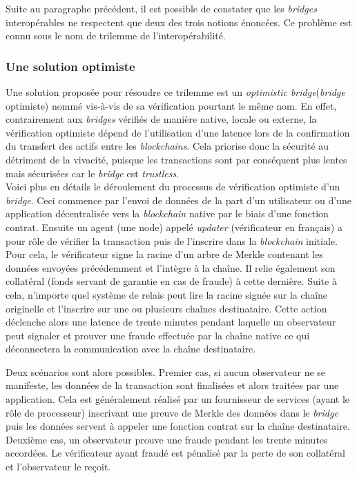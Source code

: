  Suite au paragraphe précédent, il est possible de constater que les \textit{bridges} interopérables ne respectent que deux des trois notions énoncées. Ce problème est connu sous le nom de trilemme de l’interopérabilité. 

\subsubsection{Une solution optimiste}

Une solution proposée pour résoudre ce trilemme est un \textit{optimistic bridge}(\textit{bridge} optimiste) nommé vis-à-vis de sa vérification pourtant le même nom\cite{OptimisticBhuptani}. En effet, contrairement aux \textit{bridges} vérifiés de manière native, locale ou externe, la vérification optimiste dépend de l’utilisation d’une latence lors de la confirmation du transfert des actifs entre les \textit{blockchains}. Cela priorise donc la sécurité au détriment de la vivacité, puisque les transactions sont par conséquent plus lentes mais sécurisées car le \textit{bridge} est \textit{trustless}. \\

Voici plus en détails le déroulement du processus de vérification optimiste d’un \textit{bridge}.
Ceci commence par l’envoi de données de la part d’un utilisateur ou d’une application décentralisée vers la \textit{blockchain} native par le biais d’une fonction contrat.
Ensuite un agent (une node) appelé \textit{updater} (vérificateur en français) a pour rôle de vérifier la transaction puis de l’inscrire dans la \textit{blockchain} initiale. Pour cela, le vérificateur signe la racine d’un arbre de Merkle contenant les données envoyées précédemment et l’intègre à la chaîne. Il relie également son collatéral (fonds servant de garantie en cas de fraude) à cette dernière.
Suite à cela, n’importe quel système de relais peut lire la racine signée sur la chaîne originelle et l’inscrire sur une ou plusieurs chaînes destinataire. Cette action déclenche alors une latence de trente minutes pendant laquelle un observateur peut signaler et prouver une fraude effectuée par la chaîne native ce qui déconnectera la communication avec la chaîne destinataire. 

Deux scénarios sont alors possibles. Premier cas, si aucun observateur ne se manifeste, les données de la transaction sont finalisées et alors traitées par une application. Cela est généralement réalisé par un fournisseur de services (ayant le rôle de processeur) inscrivant une preuve de Merkle des données dans le \textit{bridge} puis les données servent à appeler une fonction contrat sur la chaîne destinataire. Deuxième cas, un observateur prouve une fraude pendant les trente minutes accordées. Le vérificateur ayant fraudé est pénalisé par la perte de son collatéral et l’observateur le reçoit.

